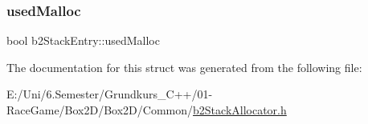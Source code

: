 \mbox{\label{structb2_stack_entry_a581b5e4699bb66a28ec0727497a4e478}} 
\subsubsection{\texorpdfstring{usedMalloc}{usedMalloc}}
{\footnotesize\ttfamily bool b2\+Stack\+Entry\+::used\+Malloc}



The documentation for this struct was generated from the following file\+:\begin{DoxyCompactItemize}
\item 
E\+:/\+Uni/6.\+Semester/\+Grundkurs\+\_\+\+C++/01-\/\+Race\+Game/\+Box2\+D/\+Box2\+D/\+Common/\mbox{\hyperlink{b2_stack_allocator_8h}{b2\+Stack\+Allocator.\+h}}\end{DoxyCompactItemize}
